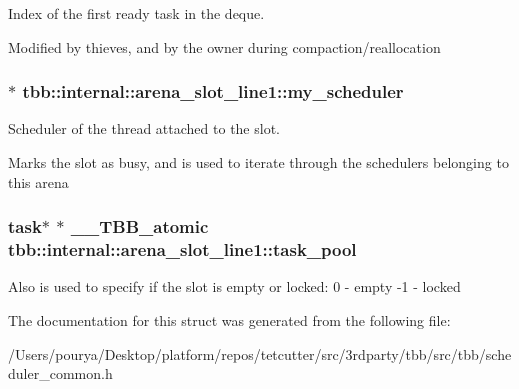 Index of the first ready task in the deque. 

Modified by thieves, and by the owner during compaction/reallocation \hypertarget{structtbb_1_1internal_1_1arena__slot__line1_a988ed3221b0b40efb97849a53b168e79}{}
\subsubsection[{my\+\_\+scheduler}]{$\ast$ tbb\+::internal\+::arena\+\_\+slot\+\_\+line1\+::my\+\_\+scheduler}\label{structtbb_1_1internal_1_1arena__slot__line1_a988ed3221b0b40efb97849a53b168e79}


Scheduler of the thread attached to the slot. 

Marks the slot as busy, and is used to iterate through the schedulers belonging to this arena \hypertarget{structtbb_1_1internal_1_1arena__slot__line1_a9096bfd9df29790ef46791385c5a8162}{}
\subsubsection[{task\+\_\+pool}]{\setlength{\rightskip}{0pt plus 5cm}task$\ast$ $\ast$ \+\_\+\+\_\+\+T\+B\+B\+\_\+atomic tbb\+::internal\+::arena\+\_\+slot\+\_\+line1\+::task\+\_\+pool}\label{structtbb_1_1internal_1_1arena__slot__line1_a9096bfd9df29790ef46791385c5a8162}
Also is used to specify if the slot is empty or locked\+: 0 -\/ empty -\/1 -\/ locked 

The documentation for this struct was generated from the following file\+:\begin{DoxyCompactItemize}
\item 
/\+Users/pourya/\+Desktop/platform/repos/tetcutter/src/3rdparty/tbb/src/tbb/scheduler\+\_\+common.\+h\end{DoxyCompactItemize}

